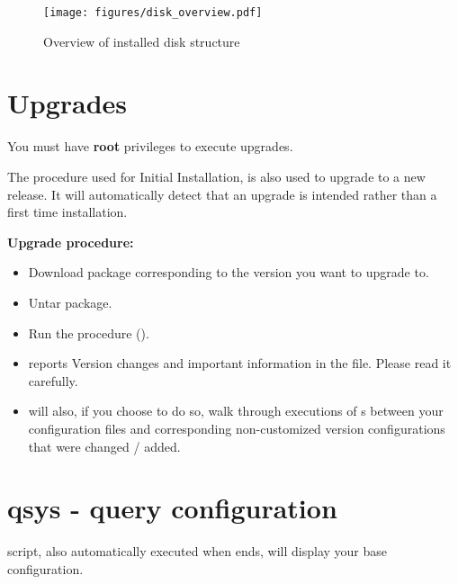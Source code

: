 \begin{figure}[!h]
	\centering
	\texttt{[image: figures/disk\_overview.pdf]}
	\caption{Overview of \webobs installed disk structure}
\end{figure}

\section{Upgrades}

You must have \textbf{root} privileges to execute \webobs upgrades.

The  procedure used for Initial Installation, is also used to upgrade \webobs to a new release.
It will automatically detect that an upgrade is intended rather than a first time installation.

\textbf{Upgrade procedure:}

\begin{itemize}
\item   Download \webobs package corresponding to the version you want to upgrade to.
\item   Untar \webobs package.
\item   Run the  procedure ().
\item   {} reports Version changes and important information in the
 file. Please read it carefully.
\item   {} will also, if you choose to do so, walk through executions of 
s between your configuration files and corresponding 
non-customized \webobs version
configurations that were changed / added. 
\end{itemize}

\section{qsys - query configuration}

 script, also automatically executed when  ends, will
display your base \webobs configuration.

